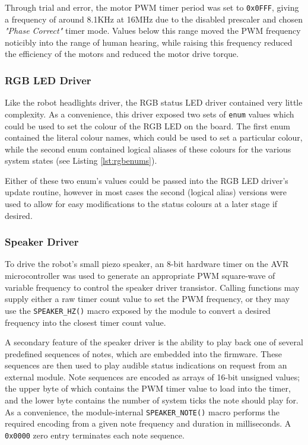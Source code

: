 Through trial and error, the motor PWM timer period was set to \lstinline{0x0FFF}, giving a frequency of around 8.1KHz at 16MHz due to the disabled prescaler and chosen \textit{"Phase Correct"} timer mode. Values below this range moved the PWM frequency noticibly into the range of human hearing, while raising this frequency reduced the efficiency of the motors and reduced the motor drive torque.

\FloatBarrier
\subsubsection{RGB LED Driver}

Like the robot headlights driver, the RGB status LED driver contained very little complexity. As a convenience, this driver exposed two sets of \lstinline{enum} values which could be used to set the colour of the RGB LED on the board. The first enum contained the literal colour names, which could be used to set a particular colour, while the second enum contained logical aliases of these colours for the various system states (see Listing \ref{lst:rgbenums}).



Either of these two enum's values could be passed into the RGB LED driver's update routine, however in most cases the second (logical alias) versions were used to allow for easy modifications to the status colours at a later stage if desired.

\FloatBarrier
\subsubsection{Speaker Driver}

To drive the robot's small piezo speaker, an 8-bit hardware timer on the AVR microcontroller was used to generate an appropriate PWM square-wave of variable frequency to control the speaker driver transistor. Calling functions may supply either a raw timer count value to set the PWM frequency, or they may use the \lstinline{SPEAKER_HZ()} macro exposed by the module to convert a desired frequency into the closest timer count value.

A secondary feature of the speaker driver is the ability to play back one of several predefined sequences of notes, which are embedded into the firmware. These sequences are then used to play audible status indications on request from an external module. Note sequences are encoded as arrays of 16-bit unsigned values; the upper byte of which contains the PWM timer value to load into the timer, and the lower byte contains the number of system ticks the note should play for. As a convenience, the module-internal \lstinline{SPEAKER_NOTE()} macro performs the required encoding from a given note frequency and duration in milliseconds. A \lstinline{0x0000} zero entry terminates each note sequence.


